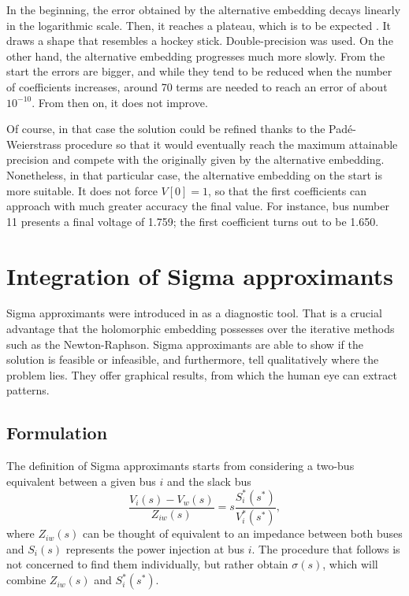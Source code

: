 \documentclass[conference]{IEEEtran}
\begin{document}
In the beginning, the error obtained by the alternative embedding decays linearly in the logarithmic scale. Then, it reaches a plateau, which is to be expected \cite{Trias2018}. It draws a shape that resembles a hockey stick. Double-precision was used. On the other hand, the alternative embedding progresses much more slowly. From the start the errors are bigger, and while they tend to be reduced when the number of coefficients increases, around 70 terms are needed to reach an error of about $10^{-10}$. From then on, it does not improve. 

Of course, in that case the solution could be refined thanks to the Padé-Weierstrass procedure \cite{Trias2018} so that it would eventually reach the maximum attainable precision and compete with the originally given by the alternative embedding. 
Nonetheless, in that particular case, the alternative embedding on the start is more suitable. It does not force $V[0]=1$, so that the first coefficients can approach with much greater accuracy the final value. For instance, bus number 11 presents a final voltage of 1.759; the first coefficient turns out to be 1.650. 

\section{Integration of Sigma approximants} \label{sec3}
Sigma approximants were introduced in \cite{Trias_sigma} as a diagnostic tool. That is a crucial advantage that the holomorphic embedding possesses over the iterative methods such as the Newton-Raphson. Sigma approximants are able to show if the solution is feasible or infeasible, and furthermore, tell qualitatively where the problem lies. They offer graphical results, from which the human eye can extract patterns. 

\subsection{Formulation}
The definition of Sigma approximants starts from considering a two-bus equivalent between a given bus $i$ and the slack bus
\begin{equation}
  \frac{V_i(s)-V_w(s)}{Z_{iw}(s)}=s\frac{S^*_i(s^*)}{V^*_i(s^*)},
  \label{s1}
\end{equation}
where $Z_{iw}(s)$ can be thought of equivalent to an impedance between both buses and $S_i(s)$ represents the power injection at bus $i$. The procedure that follows is not concerned to find them individually, but rather obtain $\sigma(s)$, which will combine $Z_{iw}(s)$ and $S^*_i(s^*)$.
\end{document}
